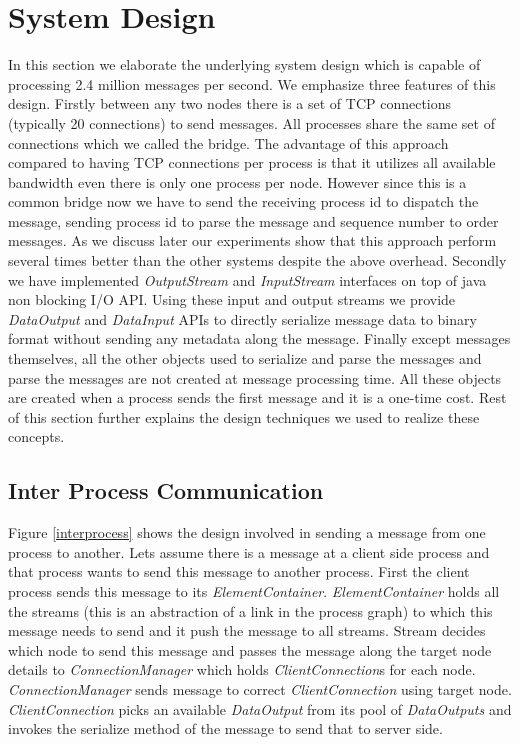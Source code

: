 \section{System Design}
In this section we elaborate the underlying system design which is capable of processing 2.4 million messages per second. We emphasize three features of this design. Firstly between any two nodes there is a set of TCP connections (typically 20 connections)  to send messages. All processes share the same set of connections which we called the bridge. The advantage of this approach compared to having TCP connections per process is that it utilizes all available bandwidth even there is only one process per node. However since this is a common bridge now we have to send the receiving process id to dispatch the message, sending  process id to parse the message and sequence number to order messages. As we discuss later our experiments show that this approach perform several times better than the other systems despite the above overhead. Secondly we have implemented \textit{OutputStream} and \textit{InputStream} interfaces on top of java non blocking I/O API. Using these input and output streams we provide \textit{DataOutput} and \textit{DataInput} APIs to directly 
serialize message data to binary format without sending any metadata along the message. Finally except messages themselves, all the other objects used to serialize and parse the messages and parse the messages are not created at message processing time. All these objects are created when a process sends the first message and it is a one-time cost. Rest of this section further explains the design techniques we used to realize these concepts.
\subsection{Inter Process Communication}
Figure \ref{interprocess} shows the design involved in sending a message from one process to another. Lets assume there is a message at a client side process and that process wants to send this message to another process. First the client process sends this message to its \textit{ElementContainer}. \textit{ElementContainer} holds all the streams (this is an abstraction of a link in the process graph) to which this message needs to send and it push the message to all streams. Stream decides which node to send this message and passes the message along the target node details to \textit{ConnectionManager} which holds \textit{ClientConnection}s for each node. \textit{ConnectionManager} sends message to correct \textit{ClientConnection} using target node. \textit{ClientConnection} picks an available \textit{DataOutput} from its pool of \textit{DataOutputs} and invokes the serialize method of the message to send that to server side.

